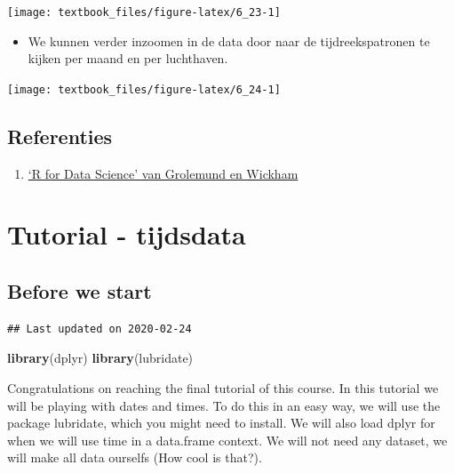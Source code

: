 \documentclass[]{tufte-book}
\newenvironment{Shaded}{}{}
\newcommand{\KeywordTok}[1]{\textcolor[rgb]{0.00,0.44,0.13}{\textbf{#1}}}
\newcommand{\NormalTok}[1]{#1}
\providecommand{\tightlist}{%
  \setlength{\itemsep}{0pt}\setlength{\parskip}{0pt}}
\begin{document}
\texttt{[image: textbook\_files/figure-latex/6\_23-1]}

\begin{itemize}
\tightlist
\item
  We kunnen verder inzoomen in de data door naar de tijdreekspatronen te kijken per maand en per luchthaven.
\end{itemize}

\texttt{[image: textbook\_files/figure-latex/6\_24-1]}

\hypertarget{referenties-5}{%
\section{Referenties}\label{referenties-5}}

\begin{enumerate}
\def\labelenumi{\arabic{enumi}.}
\tightlist
\item
  \href{http://r4ds.had.co.nz/}{`R for Data Science' van Grolemund en Wickham}
\end{enumerate}

\hypertarget{tutorial---tijdsdata}{%
\chapter{Tutorial - tijdsdata}\label{tutorial---tijdsdata}}

\hypertarget{before-we-start}{%
\section{Before we start}\label{before-we-start}}

\begin{verbatim}
## Last updated on 2020-02-24
\end{verbatim}

\begin{Shaded}
\begin{Highlighting}[]
\KeywordTok{library}\NormalTok{(dplyr) }
\KeywordTok{library}\NormalTok{(lubridate)}
\end{Highlighting}
\end{Shaded}

Congratulations on reaching the final tutorial of this course. In this tutorial we will be playing with dates and times. To do this in an easy way, we will use the package lubridate, which you might need to install. We will also load dplyr for when we will use time in a data.frame context. We will not need any dataset, we will make all data ourselfs (How cool is that?).
\end{document}
